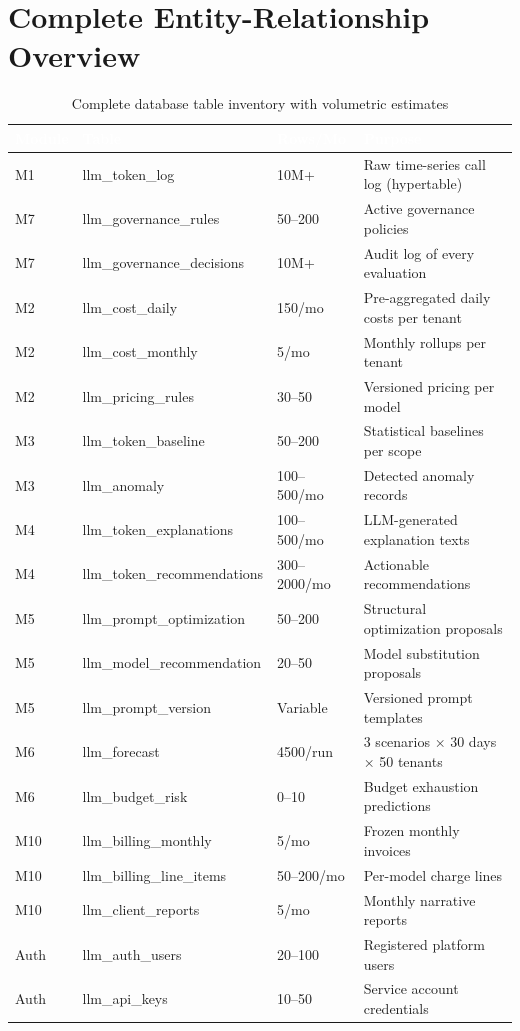\documentclass[12pt,a4paper,twoside]{report}
\begin{document}
\section{Complete Entity-Relationship Overview}

\begin{table}[H]
\centering
\small
\begin{tabularx}{\textwidth}{|l|l|l|X|}
\hline
\rowcolor{tabheader}
\textcolor{white}{\textbf{Module}} &
\textcolor{white}{\textbf{Table}} &
\textcolor{white}{\textbf{Rows/Mo}} &
\textcolor{white}{\textbf{Purpose}} \\
\hline
M1 & llm\_token\_log & 10M+ & Raw time-series call log (hypertable) \\
\hline
M7 & llm\_governance\_rules & 50--200 & Active governance policies \\
\hline
M7 & llm\_governance\_decisions & 10M+ & Audit log of every evaluation \\
\hline
M2 & llm\_cost\_daily & 150/mo & Pre-aggregated daily costs per tenant \\
\hline
M2 & llm\_cost\_monthly & 5/mo & Monthly rollups per tenant \\
\hline
M2 & llm\_pricing\_rules & 30--50 & Versioned pricing per model \\
\hline
M3 & llm\_token\_baseline & 50--200 & Statistical baselines per scope \\
\hline
M3 & llm\_anomaly & 100--500/mo & Detected anomaly records \\
\hline
M4 & llm\_token\_explanations & 100--500/mo & LLM-generated explanation texts \\
\hline
M4 & llm\_token\_recommendations & 300--2000/mo & Actionable recommendations \\
\hline
M5 & llm\_prompt\_optimization & 50--200 & Structural optimization proposals \\
\hline
M5 & llm\_model\_recommendation & 20--50 & Model substitution proposals \\
\hline
M5 & llm\_prompt\_version & Variable & Versioned prompt templates \\
\hline
M6 & llm\_forecast & 4500/run & 3 scenarios × 30 days × 50 tenants \\
\hline
M6 & llm\_budget\_risk & 0--10 & Budget exhaustion predictions \\
\hline
M10 & llm\_billing\_monthly & 5/mo & Frozen monthly invoices \\
\hline
M10 & llm\_billing\_line\_items & 50--200/mo & Per-model charge lines \\
\hline
M10 & llm\_client\_reports & 5/mo & Monthly narrative reports \\
\hline
Auth & llm\_auth\_users & 20--100 & Registered platform users \\
\hline
Auth & llm\_api\_keys & 10--50 & Service account credentials \\
\hline
\end{tabularx}
\caption{Complete database table inventory with volumetric estimates}
\label{tab:tables}
\end{table}
\end{document}
